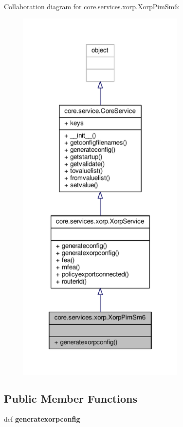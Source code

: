 Collaboration diagram for core.\+services.\+xorp.\+Xorp\+Pim\+Sm6\+:
\nopagebreak
\begin{figure}[H]
\begin{center}
\leavevmode
\includegraphics[height=550pt]{classcore_1_1services_1_1xorp_1_1_xorp_pim_sm6__coll__graph}
\end{center}
\end{figure}
\subsection*{Public Member Functions}
\begin{DoxyCompactItemize}
\item 
\hypertarget{classcore_1_1services_1_1xorp_1_1_xorp_pim_sm6_a9335f601c3a888f2029036d0e3fe4fbc}{def {\bfseries generatexorpconfig}}\label{classcore_1_1services_1_1xorp_1_1_xorp_pim_sm6_a9335f601c3a888f2029036d0e3fe4fbc}

\end{DoxyCompactItemize}
